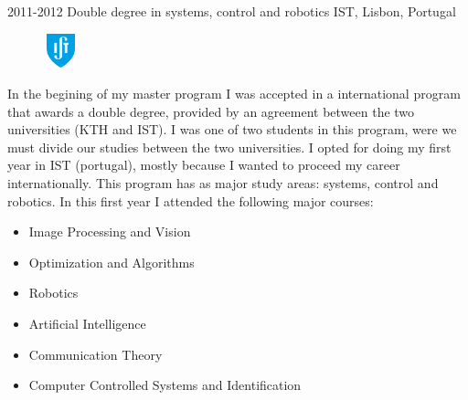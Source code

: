\documentclass[]{friggeri-cv} %
\begin{document}
\begin{entrylist2}
\entrynew
{2011-2012}
{Double degree in systems, control and robotics}
{IST, Lisbon, Portugal}
{
\begin{figure}
	\vspace{-20pt}
	\begin{center}
		\includegraphics[width=1cm,height=1cm]{ist}
	\end{center}
\end{figure}
In the begining of my master program I was accepted in a international program that awards a double degree, provided by an agreement between the two universities (KTH and IST). I was one of two students in this program, were we must divide our studies between the two universities. I opted for doing my first year in IST (portugal), mostly because I wanted to proceed my career internationally. This program has as major study areas: systems, control and robotics. In this first year I attended the following major courses:

\setlength{\columnsep}{0cm}
\begin{multicols}{2}
	\begin{itemize} \itemsep0.5pt \parskip-1pt 
		\item Image Processing and Vision
		\item Optimization and Algorithms
		\item Robotics
	\end{itemize}
	\begin{itemize}
		\item Artificial Intelligence
		\item Communication Theory
		\item Computer Controlled Systems and Identification
	\end{itemize}
\end{multicols}

}
\end{entrylist2}
\end{document}

